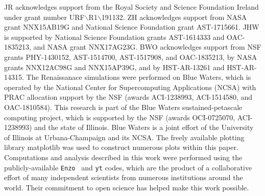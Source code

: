 \documentclass[graphics, twocolumn, usenatbib]{mn2e}
\newcommand{\enzo}{\texttt{Enzo~}}
\newcommand{\yt}{\texttt{yt}}
\begin{document}
JR acknowledges support from the Royal Society and Science Foundation Ireland under
grant number URF$\backslash$R1$\backslash$191132.
ZH acknowledges support from NASA grant NNX15AB19G and National Science Foundation grant AST-1715661.
JHW is supported by National Science Foundation grants AST-1614333 and
OAC-1835213, and NASA grant NNX17AG23G.  
BWO acknowledges support from NSF  grants  PHY-1430152,  AST-1514700, AST-1517908, and  OAC-1835213,  by  NASA grants NNX12AC98G and NNX15AP39G, and by HST-AR-13261 and HST-AR-14315.  
The Renaissanace simulations were performed on Blue 
Waters, which is operated by the National Center for Supercomputing Applications (NCSA)
with PRAC allocation support by the NSF (awards ACI-1238993, ACI-1514580, and OAC-1810584).
This research is part of the Blue Waters sustained-petascale computing project, which
is supported by the NSF (awards OCI-0725070, ACI-1238993) and the state of
Illinois. Blue Waters is a joint effort of the University of Illinois at
Urbana-Champaign and its NCSA.  The freely available plotting library {\sc
matplotlib} \citep{matplotlib} was used to construct numerous plots within this
paper. Computations and analysis described in this work were performed using the
publicly-available \enzo \citep{Enzo_2014, Enzo_2019} and \yt{} \citep{YT} codes, which are the product of a
collaborative effort of many independent scientists from numerous institutions
around the world. Their commitment to open science
has helped make this work possible.



\end{document}

